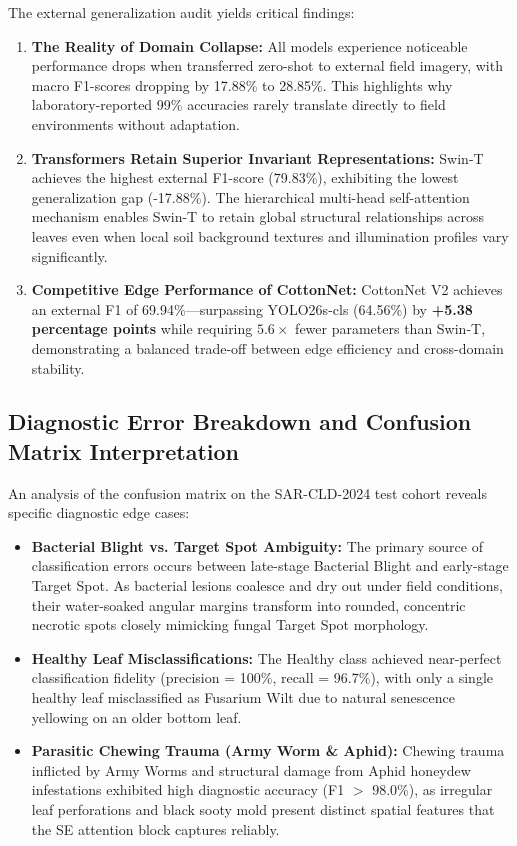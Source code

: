 \documentclass[journal,10pt,twocolumn]{IEEEtran}
\begin{document}
The external generalization audit yields critical findings:
\begin{enumerate}[leftmargin=*]
    \item \textbf{The Reality of Domain Collapse:} All models experience noticeable performance drops when transferred zero-shot to external field imagery, with macro F1-scores dropping by 17.88\% to 28.85\%. This highlights why laboratory-reported 99\% accuracies rarely translate directly to field environments without adaptation.
    \item \textbf{Transformers Retain Superior Invariant Representations:} Swin-T achieves the highest external F1-score (79.83\%), exhibiting the lowest generalization gap (-17.88\%). The hierarchical multi-head self-attention mechanism enables Swin-T to retain global structural relationships across leaves even when local soil background textures and illumination profiles vary significantly.
    \item \textbf{Competitive Edge Performance of CottonNet:} CottonNet V2 achieves an external F1 of 69.94\%---surpassing YOLO26s-cls (64.56\%) by \textbf{+5.38 percentage points} while requiring $5.6\times$ fewer parameters than Swin-T, demonstrating a balanced trade-off between edge efficiency and cross-domain stability.
\end{enumerate}

\subsection{Diagnostic Error Breakdown and Confusion Matrix Interpretation}
An analysis of the confusion matrix on the SAR-CLD-2024 test cohort reveals specific diagnostic edge cases:
\begin{itemize}[leftmargin=*]
    \item \textbf{Bacterial Blight vs. Target Spot Ambiguity:} The primary source of classification errors occurs between late-stage Bacterial Blight and early-stage Target Spot. As bacterial lesions coalesce and dry out under field conditions, their water-soaked angular margins transform into rounded, concentric necrotic spots closely mimicking fungal Target Spot morphology.
    \item \textbf{Healthy Leaf Misclassifications:} The Healthy class achieved near-perfect classification fidelity (precision = 100\%, recall = 96.7\%), with only a single healthy leaf misclassified as Fusarium Wilt due to natural senescence yellowing on an older bottom leaf.
    \item \textbf{Parasitic Chewing Trauma (Army Worm \& Aphid):} Chewing trauma inflicted by Army Worms and structural damage from Aphid honeydew infestations exhibited high diagnostic accuracy (F1 $>$ 98.0\%), as irregular leaf perforations and black sooty mold present distinct spatial features that the SE attention block captures reliably.
\end{itemize}
\end{document}
